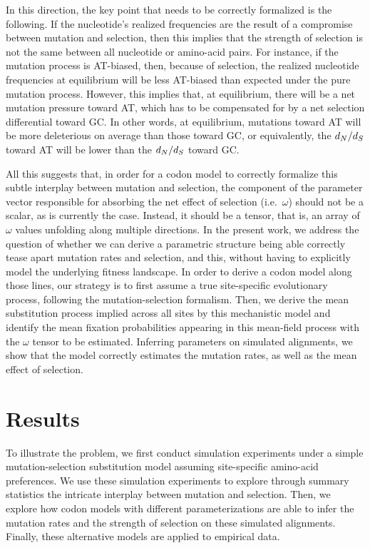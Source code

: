 \documentclass{article}
\begin{document}
In this direction, the key point that needs to be correctly formalized is the following.
If the nucleotide's realized frequencies are the result of a compromise between mutation and selection, then this implies that the strength of selection is not the same between all nucleotide or amino-acid pairs.
For instance, if the mutation process is AT-biased, then, because of selection, the realized nucleotide frequencies at equilibrium will be less AT-biased than expected under the pure mutation process.
However, this implies that, at equilibrium, there will be a net mutation pressure toward AT, which has to be compensated for by a net selection differential toward GC.
In other words, at equilibrium, mutations toward AT will be more deleterious on average than those toward GC, or equivalently, the $d_N / d_S$ toward AT will be lower than the $d_N / d_S$ toward GC.

All this suggests that, in order for a codon model to correctly formalize this subtle interplay between mutation and selection, the component of the parameter vector responsible for absorbing the net effect of selection (i.e.~$\omega$) should not be a scalar, as is currently the case.
Instead, it should be a tensor, that is, an array of $\omega$ values unfolding along multiple directions.
In the present work, we address the question of whether we can derive a parametric structure being able correctly tease apart mutation rates and selection, and this, without having to explicitly model the underlying fitness landscape.
In order to derive a codon model along those lines, our strategy is to first assume a true site-specific evolutionary process, following the mutation-selection formalism.
Then, we derive the mean {substitution} process implied across all sites by this mechanistic model and identify the mean fixation probabilities appearing in this mean-field process with the $\omega$ tensor to be estimated.
Inferring parameters on simulated alignments, we show that the model correctly estimates the mutation rates, as well as the mean effect of selection.

\section{Results}
\label{sec:results}

To illustrate the problem, we first conduct simulation experiments under a simple mutation-selection {substitution} model assuming site-specific amino-acid preferences.
We use these simulation experiments to explore through summary statistics the intricate interplay between mutation and selection.
Then, we explore how codon models with different parameterizations are able to infer the mutation rates and the strength of selection on these simulated alignments.
Finally, these alternative models are applied to empirical data.
\end{document}
